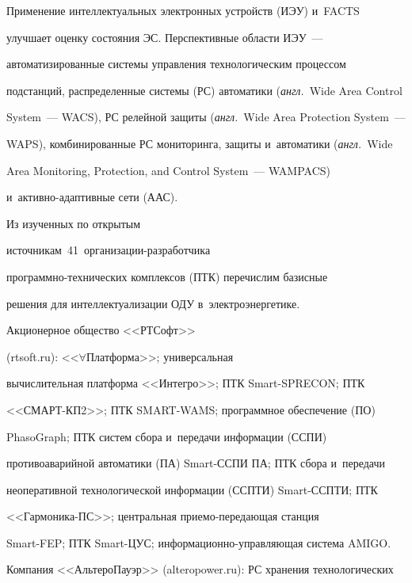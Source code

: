   


  Применение интеллектуальных электронных устройств (ИЭУ) и~FACTS  


улучшает оценку состояния ЭС. Перспективные области ИЭУ~--- 


автоматизированные системы управления технологическим процессом 


подстанций, распределенные системы (РС) автоматики (\textit{англ.}\ Wide Area Control 


System~--- WACS), РС релейной защиты (\textit{англ.}\ Wide Area Protection System~--- 


WAPS), комбинированные РС мониторинга, защиты и~автоматики (\textit{англ.}\ Wide 


Area Monitoring, Protection, and Control System~--- WAMPACS)  


и~ак\-тив\-но-адап\-тив\-ные сети (ААС).


  


  Из изученных по открытым  


источникам~41~ор\-га\-ни\-за\-ции-раз\-ра\-бот\-чи\-ка  


про\-грам\-мно-тех\-ни\-че\-ских комплексов (ПТК) перечислим базисные 


решения для интеллектуализации ОДУ в~электроэнергетике. 





Акционерное общество <<РТСофт>> 


({\small {\sf rtsoft.ru}}): <<$\forall$Платформа>>; универсальная 


вычислительная плат\-фор\-ма <<Интегро>>; ПТК Smart-SPRECON; ПТК 


<<СМАРТ-КП2>>; ПТК SMART-WAMS; программное обеспечение (ПО) 


\mbox{PhasoGraph}; ПТК сис\-тем сбора и~передачи информации (ССПИ) 


противоаварийной автоматики (ПА) Smart-ССПИ ПА; ПТК сбора и~передачи 


неоперативной технологической информации (ССПТИ) Smart-ССПТИ; ПТК 


<<Гар\-мо\-ни\-ка-ПС>>; цент\-раль\-ная при\-емо-пе\-ре\-да\-ющая станция  


Smart-FEP; ПТК Smart-ЦУС; ин\-фор\-ма\-ци\-он\-но-управ\-ля\-ющая сис\-те\-ма AMIGO. 





Компания <<АльтероПауэр>> (alteropower.ru): РС хранения технологических 


